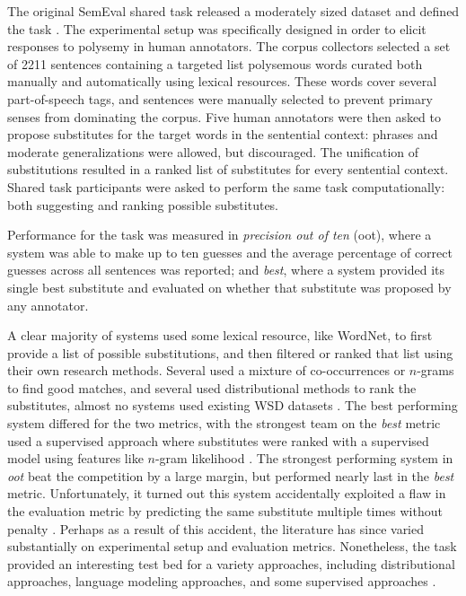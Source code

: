 The original SemEval shared task released a moderately sized dataset and
defined the task \cite{mccarthy:2007:semeval}. The experimental setup was
specifically designed in order to elicit responses to polysemy in human
annotators. The corpus collectors selected a set of 2211 sentences containing
a targeted list polysemous words curated both manually and automatically using
lexical resources. These words cover several part-of-speech tags, and sentences
were manually selected to prevent primary senses from dominating the corpus.
Five human annotators were then asked to propose substitutes for the target
words in the sentential context: phrases and moderate generalizations were
allowed, but discouraged. The unification of substitutions resulted in a ranked
list of substitutes for every sentential context. Shared task participants
were asked to perform the same task computationally: both suggesting and
ranking possible substitutes.

Performance for the task was measured in {\em precision out of ten} (oot),
where a system was able to make up to ten guesses and the average percentage
of correct guesses across all sentences was reported; and {\em best}, where
a system provided its single best substitute and evaluated on whether that
substitute was proposed by any annotator.

A clear majority of systems used some lexical resource, like WordNet, to first
provide a list of possible substitutions, and then filtered or ranked that list
using their own research methods. Several used a mixture of co-occurrences or
$n$-grams to find good matches, and several used distributional methods to rank
the substitutes, almost no systems used existing WSD datasets
\cite{mccarthy:2007:semeval}. The best performing system differed for the two
metrics, with the strongest team on the {\em best} metric used a
supervised approach where substitutes were ranked with a supervised model
using features like $n$-gram likelihood \cite{yuret:2007:semeval}. The strongest
performing system in {\em oot} beat the competition by a large margin, but
performed nearly last in the {\em best} metric.  Unfortunately, it turned out
this system accidentally exploited a flaw in the evaluation metric by
predicting the same substitute multiple times without penalty
\cite{giuliano:2007:semeval}. Perhaps as a result of this accident, the
literature has since varied substantially on experimental setup and evaluation
metrics. Nonetheless, the task provided an interesting test bed for a
variety approaches, including distributional approaches, language modeling
approaches, and some supervised approaches \cite{szarvas:2013:naacl}.

